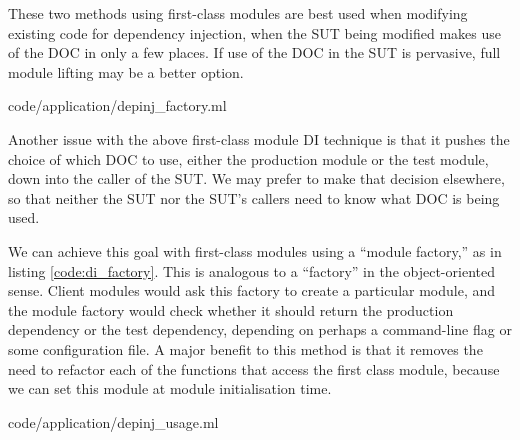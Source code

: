 These two methods using first-class modules are best used when
modifying existing code for dependency injection, when the SUT being
modified makes use of the DOC in only a few places. If use of the DOC
in the SUT is pervasive, full module lifting may be a better option.

 {code/application/depinj_factory.ml}

Another issue with the above first-class module DI technique is that
it pushes the choice of which DOC to use, either the production module
or the test module, down into the caller of the SUT. We may prefer to
make that decision elsewhere, so that neither the SUT nor the SUT's
callers need to know what DOC is being used.

We can achieve this goal with first-class modules using a ``module
factory,'' as in listing \ref{code:di_factory}. This is analogous to a
``factory'' in the object-oriented sense. Client modules would ask
this factory to create a particular module, and the module factory
would check whether it should return the production dependency or the
test dependency, depending on perhaps a command-line flag or some
configuration file. A major benefit to this method is that it removes
the need to refactor each of the functions that access the first class
module, because we can set this module at module initialisation time.

 {code/application/depinj_usage.ml}





